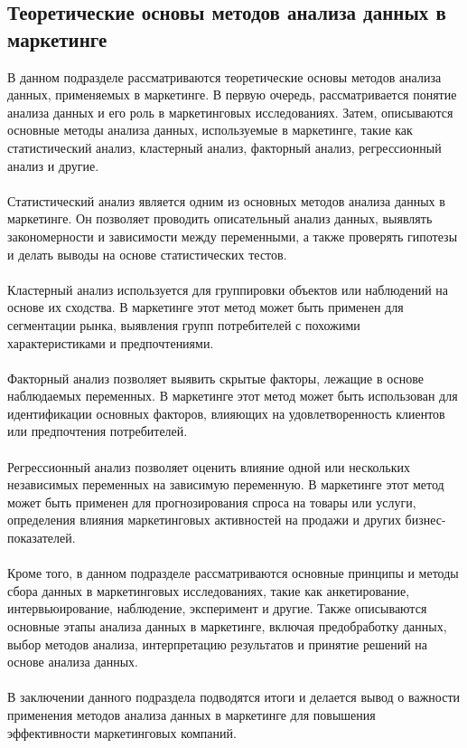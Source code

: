 \documentclass{article}
\begin{document}
\subsection{Теоретические основы методов анализа данных в маркетинге}
В данном подразделе рассматриваются теоретические основы методов анализа данных, применяемых в маркетинге. В первую очередь, рассматривается понятие анализа данных и его роль в маркетинговых исследованиях. Затем, описываются основные методы анализа данных, используемые в маркетинге, такие как статистический анализ, кластерный анализ, факторный анализ, регрессионный анализ и другие.\\
~\\
Статистический анализ является одним из основных методов анализа данных в маркетинге. Он позволяет проводить описательный анализ данных, выявлять закономерности и зависимости между переменными, а также проверять гипотезы и делать выводы на основе статистических тестов.\\
~\\
Кластерный анализ используется для группировки объектов или наблюдений на основе их сходства. В маркетинге этот метод может быть применен для сегментации рынка, выявления групп потребителей с похожими характеристиками и предпочтениями.\\
~\\
Факторный анализ позволяет выявить скрытые факторы, лежащие в основе наблюдаемых переменных. В маркетинге этот метод может быть использован для идентификации основных факторов, влияющих на удовлетворенность клиентов или предпочтения потребителей.\\
~\\
Регрессионный анализ позволяет оценить влияние одной или нескольких независимых переменных на зависимую переменную. В маркетинге этот метод может быть применен для прогнозирования спроса на товары или услуги, определения влияния маркетинговых активностей на продажи и других бизнес-показателей.\\
~\\
Кроме того, в данном подразделе рассматриваются основные принципы и методы сбора данных в маркетинговых исследованиях, такие как анкетирование, интервьюирование, наблюдение, эксперимент и другие. Также описываются основные этапы анализа данных в маркетинге, включая предобработку данных, выбор методов анализа, интерпретацию результатов и принятие решений на основе анализа данных.\\
~\\
В заключении данного подраздела подводятся итоги и делается вывод о важности применения методов анализа данных в маркетинге для повышения эффективности маркетинговых компаний.
\end{document}

